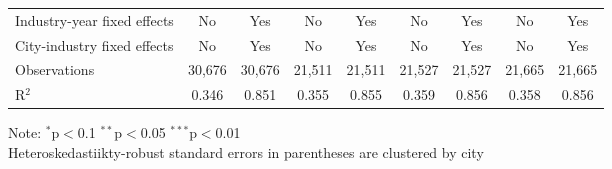 \documentclass[12pt]{article}
\begin{document}
\begin{table}[!htbp]
\begin{adjustbox}{width=\textwidth, totalheight=\baselineskip,keepaspectratio}
\begin{tabular}{@{\extracolsep{5pt}}lcccccccc}
Industry-year fixed effects & No & Yes & No & Yes & No & Yes & No & Yes \\ 
City-industry fixed effects & No & Yes & No & Yes & No & Yes & No & Yes \\ 
Observations & 30,676 & 30,676 & 21,511 & 21,511 & 21,527 & 21,527 & 21,665 & 21,665 \\ 
R$^{2}$ & 0.346 & 0.851 & 0.355 & 0.855 & 0.359 & 0.856 & 0.358 & 0.856 \\ 
    \end{tabular}
    \end{adjustbox}
    \begin{tablenotes}
      \small
      \item 
      Note: $^{*}$p$<$0.1 $^{**}$p$<$0.05 $^{***}$p$<$0.01 \\
      Heteroskedastiikty-robust standard errors in parentheses are clustered by city \\
      \\
    \end{tablenotes}
\end{table}
\end{document}
